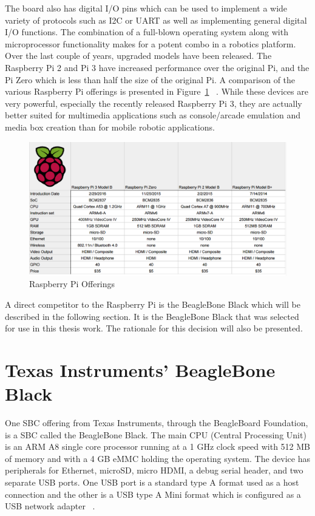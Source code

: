 \documentclass[12pt,oneside,final]{siuethesis}
\theoremstyle{definition}
\begin{document}
The board also has digital I/O pins which can be used to implement a wide variety of protocols such as I2C or UART as well as implementing general digital I/O functions. The combination of a full-blown operating system along with microprocessor functionality makes for a potent combo in a robotics platform. Over the last couple of years, upgraded models have been released. The Raspberry Pi 2 and  Pi 3  have increased performance over the original Pi, and the Pi Zero which is less than half the size of the original Pi. A comparison of the various Raspberry Pi offerings is presented in Figure~\ref{fig:Pi_offer} ~\cite{RPi3}. While these devices are very powerful, especially the recently released Raspberry Pi 3, they are actually better suited for multimedia applications such as console/arcade emulation and media box creation than for mobile robotic applications.

\begin{figure}[htbp!]
\centering
\includegraphics[scale=.4,keepaspectratio=true]{./images/pispecs2.png}
\caption{Raspberry Pi Offerings }
\label{fig:Pi_offer}
\end{figure}


A direct competitor to the Raspberry Pi is the BeagleBone Black which will be described in the following section.  It is the BeagleBone Black that was selected for use in this thesis work. The rationale for this decision will also be presented.

\section{Texas Instruments' BeagleBone Black}

One SBC offering from Texas Instruments, through the BeagleBoard Foundation, is a SBC called the BeagleBone Black. The main CPU (Central Processing Unit) is an ARM A8 single core processor running at a 1 GHz clock speed with 512 MB of memory and with a 4 GB eMMC holding the operating system. The device has peripherals for Ethernet, microSD, micro HDMI, a debug serial header, and two separate USB ports. One USB port is a standard type A format used as a host connection and the other is a USB type A Mini format which is configured as a USB network adapter ~\cite{eLinux-BeagleBone}. 
\end{document}
